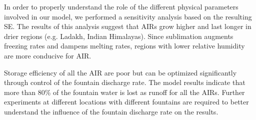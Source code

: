 \documentclass[utf8]{frontiersSCNS} %
\begin{document}
In order to properly understand the role of the different physical parameters involved in our model, we performed a sensitivity analysis based on the resulting SE. The results of this analysis suggest that AIRs grow higher and last longer in drier regions (e.g. Ladakh, Indian Himalayas). Since sublimation augments freezing rates and dampens melting
rates, regions with lower relative humidity are more conducive for AIR.

Storage efficiency of all the AIR are poor but can be optimized significantly through control of the fountain discharge
rate.  The model results indicate that more than 80\% of the fountain water is lost as runoff for all the AIRs.
Further experiments at different locations with different fountains are required to better understand the influence of
the fountain discharge rate on the results.



\end{document}
